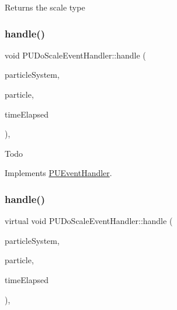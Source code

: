 Returns the scale type \mbox{\label{classPUDoScaleEventHandler_abf88206cfacb19b198323e5a15c74f6a}} 
\subsubsection{\texorpdfstring{handle()}{handle()}\hspace{0.1cm}{\footnotesize\ttfamily [1/2]}}
{\footnotesize\ttfamily void P\+U\+Do\+Scale\+Event\+Handler\+::handle (\begin{DoxyParamCaption}\item[{\hyperlink{classPUParticleSystem3D}{P\+U\+Particle\+System3D} $\ast$}]{particle\+System,  }\item[{\hyperlink{structPUParticle3D}{P\+U\+Particle3D} $\ast$}]{particle,  }\item[{float}]{time\+Elapsed }\end{DoxyParamCaption})\hspace{0.3cm}{\ttfamily [override]}, {\ttfamily [virtual]}}

Todo 

Implements \hyperlink{classPUEventHandler_a760172609708c65548dcac364c9b3b9c}{P\+U\+Event\+Handler}.

\mbox{\label{classPUDoScaleEventHandler_a0d4d629277b91a58487794e2791f041d}} 
\subsubsection{\texorpdfstring{handle()}{handle()}\hspace{0.1cm}{\footnotesize\ttfamily [2/2]}}
{\footnotesize\ttfamily virtual void P\+U\+Do\+Scale\+Event\+Handler\+::handle (\begin{DoxyParamCaption}\item[{\hyperlink{classPUParticleSystem3D}{P\+U\+Particle\+System3D} $\ast$}]{particle\+System,  }\item[{\hyperlink{structPUParticle3D}{P\+U\+Particle3D} $\ast$}]{particle,  }\item[{float}]{time\+Elapsed }\end{DoxyParamCaption})\hspace{0.3cm}{\ttfamily [override]}, {\ttfamily [virtual]}}

